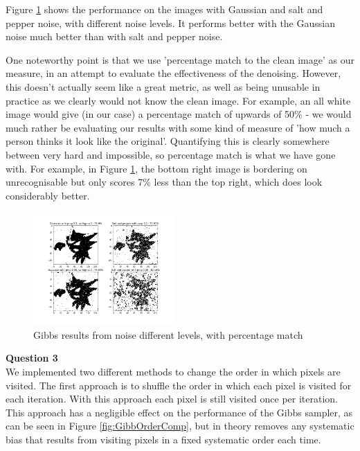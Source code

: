 \documentclass[10pt, a4paper, twocolumn]{article} %
\begin{document}
Figure \ref{fig:GibbDifferentLevels} shows the performance on the images with Gaussian and salt and pepper noise, with different noise levels. It performs better with the Gaussian noise much better than with salt and pepper noise.

One noteworthy point is that we use 'percentage match to the clean image' as our measure, in an attempt to evaluate the effectiveness of the denoising. However, this doesn't actually seem like a great metric, as well as being unusable in practice as we clearly would not know the clean image. For example, an all white image would give (in our case) a percentage match of upwards of 50\% - we would much rather be evaluating our results with some kind of measure of 'how much a person thinks it look like the original'. Quantifying this is clearly somewhere between very hard and impossible, so percentage match is what we have gone with. For example, in Figure \ref{fig:GibbDifferentLevels}, the bottom right image is bordering on unrecognisable but only scores 7\% less than the top right, which does look considerably better. 

\begin{figure}
    \centering
    \includegraphics[width=0.48\textwidth]{images/GibbGridDifferentLevels.png}
    \caption{Gibbs results from noise different levels, with percentage match}
    \label{fig:GibbDifferentLevels}
\end{figure}

\textbf{Question 3} \\
We implemented two different methods to change the order in which pixels are visited. The first approach is to shuffle the order in which each pixel is visited for each iteration. With this approach each pixel is still visited once per iteration. This approach has a negligible effect on the performance of the Gibbs sampler, as can be seen in Figure \ref{fig:GibbOrderComp}, but in theory removes any systematic bias that results from visiting pixels in a fixed systematic order each time.
\end{document}
